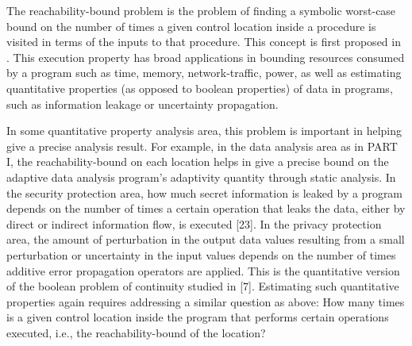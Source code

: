 The reachability-bound problem is
the problem of finding a symbolic worst-case bound on the number of times a given control location 
inside a procedure is visited in terms of the inputs to that procedure.
This concept is first proposed in \cite{GulwaniZ10}.
This execution property has broad
applications in bounding resources consumed by a program such as time, memory,
network-traffic, power, as well as estimating quantitative properties (as opposed to boolean properties)
of data in programs, such as information leakage or uncertainty propagation.

In some quantitative property analysis area, this problem is important in helping give a precise analysis result.
For example, in the data analysis area as in PART I, the reachability-bound on each location helps
in give a precise bound on the adaptive data analysis program's adaptivity quantity through static analysis.
In the security protection area,
how much secret information is leaked by a program depends on the number of times a certain operation that leaks the data,
either by direct or indirect information flow, is executed [23].
In the privacy protection area, the amount of perturbation in the output data values resulting
from a small perturbation or uncertainty in the input values depends on the number of times additive error propagation operators are applied.
This is the quantitative version of the boolean problem of continuity studied in [7]. 
Estimating such quantitative properties again requires addressing a similar question as above:
How many times is a given control location inside the program that performs certain operations executed,
i.e., the
reachability-bound of the location?

